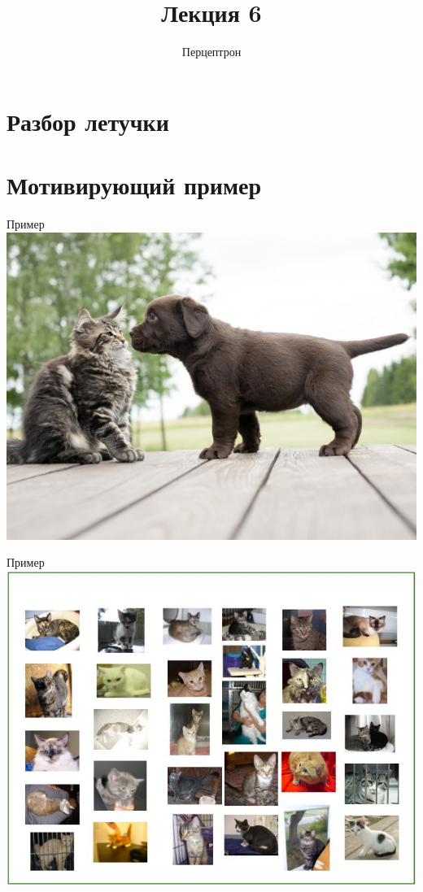 \documentclass[10pt]{beamer}
\title{Лекция 6}
\subtitle{Перцептрон}
\begin{document}
\section{Разбор летучки}

\maketitle

\section{Мотивирующий пример}

{
\begin{frame}{Пример}
  \centering
  \includegraphics[width=0.9 \textwidth, keepaspectratio]{images/catvsdog}
\end{frame}
}

{
\begin{frame}{Пример}
  \centering
  \includegraphics[width=0.9 \textwidth, keepaspectratio]{images/cats}
\end{frame}
}
\end{document}
